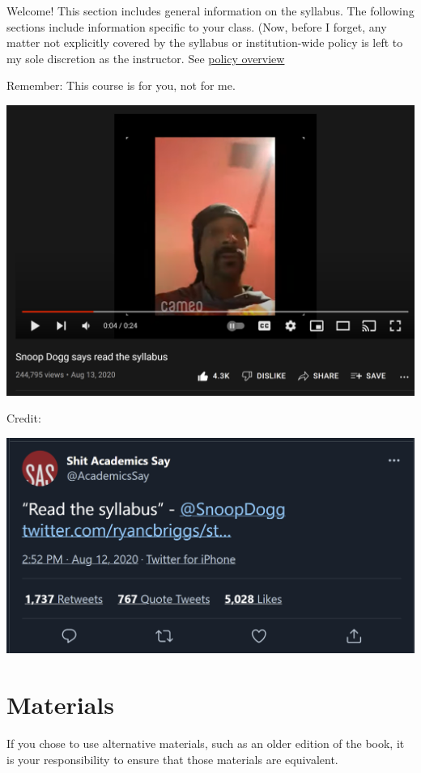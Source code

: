 Welcome! This section includes general information on the syllabus. The following sections include information specific to your class. (Now, before I forget, any matter not explicitly covered by the syllabus or institution-wide policy is left to my sole discretion as the instructor. See \protect\hyperlink{policy-overview}{policy overview}

Remember: This course is for you, not for me.

\includegraphics[width=29.86in]{img/snoop}

Credit:

\includegraphics[width=19.31in]{img/AcademicsSaystatus}

\hypertarget{materials}{%
\section{Materials}\label{materials}}

If you chose to use alternative materials, such as an older edition of the book, it is your responsibility to ensure that those materials are equivalent.

